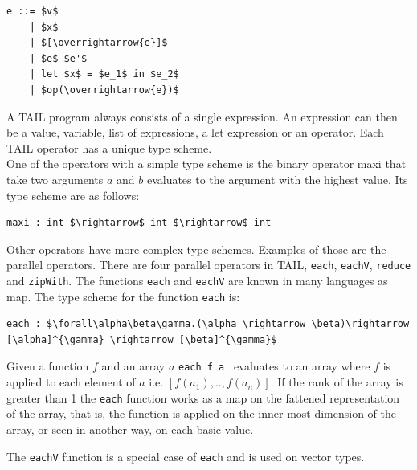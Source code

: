 \documentclass[11pt]{article}
\begin{document}
\begin{lstlisting}[numbers=none,frame=none]
e ::= $v$ 
    | $x$ 
    | $[\overrightarrow{e}]$ 
    | $e$ $e'$ 
    | let $x$ = $e_1$ in $e_2$ 
    | $op(\overrightarrow{e})$
\end{lstlisting}
A TAIL program always consists of a single expression. An expression can then be a value, variable, 
list of expressions, a let expression or an operator. Each TAIL operator has a unique type scheme. \\

One of the operators with a simple type scheme is the binary operator maxi that take two arguments $a$ and $b$ evaluates to the argument with the highest value. Its type scheme are as follows:
\begin{lstlisting}[numbers=none,frame=none]
maxi : int $\rightarrow$ int $\rightarrow$ int
\end{lstlisting}

Other operators have more complex type schemes. Examples of those are the parallel operators. 
There are four parallel operators in TAIL, {\tt each}, {\tt eachV}, {\tt reduce} and {\tt zipWith}.
The functions {\tt each} and {\tt eachV} are known in many languages as map.
The type scheme for the function {\tt each} is:
\begin{lstlisting}[numbers=none,frame=none]
each : $\forall\alpha\beta\gamma.(\alpha \rightarrow \beta)\rightarrow [\alpha]^{\gamma} \rightarrow [\beta]^{\gamma}$
\end{lstlisting}
Given a function $f$ and an array $a$ {\tt each f a } evaluates to an array where $f$ is applied to each element of $a$ i.e. $[f(a_1),..,f(a_n)]$.
If the rank of the array is greater than 1 the {\tt each} function works as a map on the fattened representation of the array,
that is, the function is applied on the inner most dimension of the array, or seen in another way, on each basic value.

The {\tt eachV} function is a special case of {\tt each} and is used on vector types.\\
\end{document}
